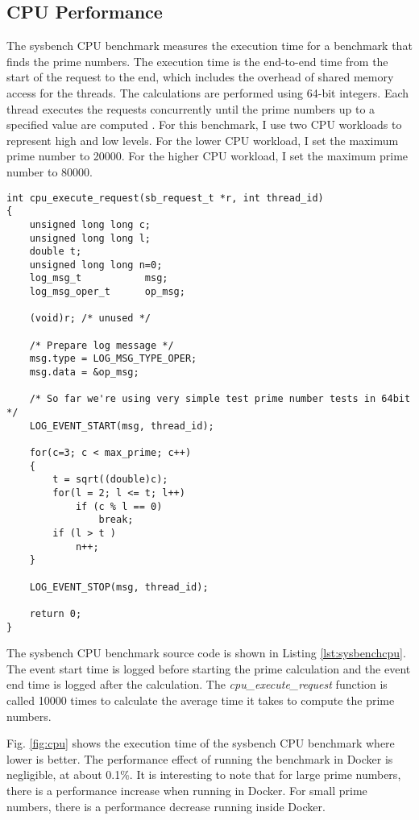 \documentclass[11pt]{article}
\begin{document}
\subsection{CPU Performance}
The sysbench CPU benchmark measures the execution time for a benchmark that finds the prime numbers. The execution time is the end-to-end time from the start of the request to the end, which includes the overhead of shared memory access for the threads. The calculations are performed using 64-bit integers. Each thread executes the requests concurrently until the prime numbers up to a specified value are computed \cite{kopytov}. For this benchmark, I use two CPU workloads to represent high and low levels. For the lower CPU workload, I set the maximum prime number to 20000. For the higher CPU workload, I set the maximum prime number to 80000. 

\lstset{caption=Sysbench CPU Benchmark Source Code, label=lst:sysbenchcpu}
\begin{lstlisting}
int cpu_execute_request(sb_request_t *r, int thread_id)
{
	unsigned long long c;
	unsigned long long l;
	double t;
	unsigned long long n=0;
	log_msg_t           msg;
	log_msg_oper_t      op_msg;
	
	(void)r; /* unused */
	
	/* Prepare log message */
	msg.type = LOG_MSG_TYPE_OPER;
	msg.data = &op_msg;
	
	/* So far we're using very simple test prime number tests in 64bit */
	LOG_EVENT_START(msg, thread_id);
	
	for(c=3; c < max_prime; c++)  
	{
		t = sqrt((double)c);
		for(l = 2; l <= t; l++)
			if (c % l == 0)
				break;
		if (l > t )
			n++; 
	}
	
	LOG_EVENT_STOP(msg, thread_id);
	
	return 0;
}
\end{lstlisting}

The sysbench CPU benchmark source code is shown in Listing \ref{lst:sysbenchcpu}. The event start time is logged before starting the prime calculation and the event end time is logged after the calculation. The \textit{cpu\_execute\_request} function is called 10000 times to calculate the average time it takes to compute the prime numbers. 

Fig. \ref{fig:cpu} shows the execution time of the sysbench CPU benchmark where lower is better. The performance effect of running the benchmark in Docker is negligible, at about 0.1\%. It is interesting to note that for large prime numbers, there is a performance increase when running in Docker. For small prime numbers, there is a performance decrease running inside Docker.
\end{document}
